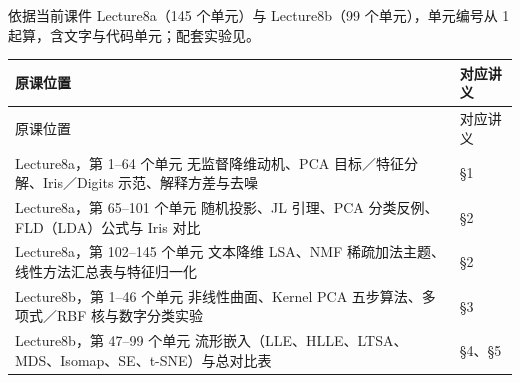 
依据当前课件 Lecture8a（145 个单元）与 Lecture8b（99 个单元），单元编号从 1 起算，含文字与代码单元；配套实验见。

\begingroup\small\setlength{\tabcolsep}{3pt}\renewcommand{\arraystretch}{1.22}
\begin{longtable}{@{}>{\raggedright\arraybackslash}p{}>{\raggedright\arraybackslash}p{}@{}}
\toprule
原课位置 & 对应讲义 \\
\midrule\endfirsthead
原课位置 & 对应讲义 \\
\midrule\endhead
\bottomrule\endfoot
Lecture8a，第 1–64 个单元 无监督降维动机、PCA 目标／特征分解、Iris／Digits 示范、解释方差与去噪 & §1 \\
Lecture8a，第 65–101 个单元 随机投影、JL 引理、PCA 分类反例、FLD（LDA）公式与 Iris 对比 & §2 \\
Lecture8a，第 102–145 个单元 文本降维 LSA、NMF 稀疏加法主题、线性方法汇总表与特征归一化 & §2 \\
Lecture8b，第 1–46 个单元 非线性曲面、Kernel PCA 五步算法、多项式／RBF 核与数字分类实验 & §3 \\
Lecture8b，第 47–99 个单元 流形嵌入（LLE、HLLE、LTSA、MDS、Isomap、SE、t-SNE）与总对比表 & §4、§5 \\
\end{longtable}\endgroup
